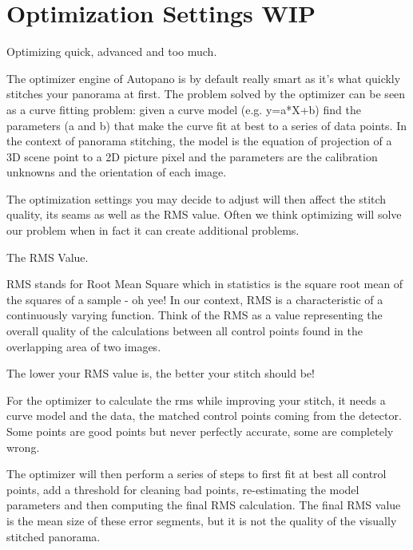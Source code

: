 \chapter{Optimization Settings WIP}
\pagecolor{white}
\label{chap:35}
\begin{fullwidth}

\problem

{\large Optimizing quick, advanced and too much. \par}

The optimizer engine of Autopano is by default really smart as it’s what quickly stitches your panorama at first. The problem solved by the optimizer can be seen as a curve fitting problem: given a curve model (e.g. y=a*X+b) find the parameters (a and b) that make the curve fit at best to a series of data points. In the context of panorama stitching, the model is the equation of projection of a 3D scene point to a 2D picture pixel and the parameters are the calibration unknowns and the orientation of each image.

The optimization settings you may decide to adjust will then affect the stitch quality, its seams as well as the RMS value. Often we think optimizing will solve our problem when in fact it can create additional problems.

\solution

{\large The RMS Value. \par}

RMS stands for Root Mean Square which in statistics is the square root mean of the squares of a sample - oh yee! In our context, RMS is a characteristic of a continuously varying function. Think of the RMS as a value representing the overall quality of the calculations between all control points found in the overlapping area of two images.

The lower your RMS value is, the better your stitch should be!


For the optimizer to calculate the rms while improving your stitch, it needs a curve model and the data, the matched control points coming from the detector. Some points are good points but never perfectly accurate, some are completely wrong. 

The optimizer will then perform a series of steps to first fit at best all control points, add a threshold for cleaning bad points, re-estimating the model parameters and then computing the final RMS calculation. The final RMS value is the mean size of these error segments, but it is not the quality of the visually stitched panorama.


\end{fullwidth}
